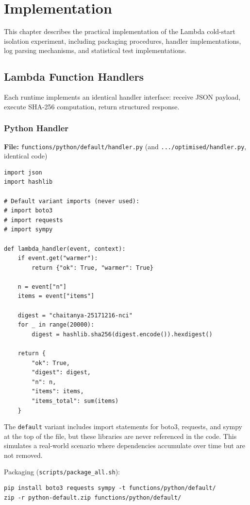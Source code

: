 \chapter{Implementation}
\label{ch:implementation}

This chapter describes the practical implementation of the Lambda cold-start isolation experiment, including packaging procedures, handler implementations, log parsing mechanisms, and statistical test implementations.

\section{Lambda Function Handlers}

Each runtime implements an identical handler interface: receive JSON payload, execute SHA-256 computation, return structured response.

\subsection{Python Handler}

\textbf{File:} \texttt{functions/python/default/handler.py} (and \texttt{.../optimised/handler.py}, identical code)

\begin{verbatim}
import json
import hashlib

# Default variant imports (never used):
# import boto3
# import requests
# import sympy

def lambda_handler(event, context):
    if event.get("warmer"):
        return {"ok": True, "warmer": True}
    
    n = event["n"]
    items = event["items"]
    
    digest = "chaitanya-25171216-nci"
    for _ in range(20000):
        digest = hashlib.sha256(digest.encode()).hexdigest()
    
    return {
        "ok": True,
        "digest": digest,
        "n": n,
        "items": items,
        "items_total": sum(items)
    }
\end{verbatim}

The \texttt{default} variant includes import statements for boto3, requests, and sympy at the top of the file, but these libraries are never referenced in the code. This simulates a real-world scenario where dependencies accumulate over time but are not removed.

Packaging (\texttt{scripts/package\_all.sh}):
\begin{verbatim}
pip install boto3 requests sympy -t functions/python/default/
zip -r python-default.zip functions/python/default/
\end{verbatim}

